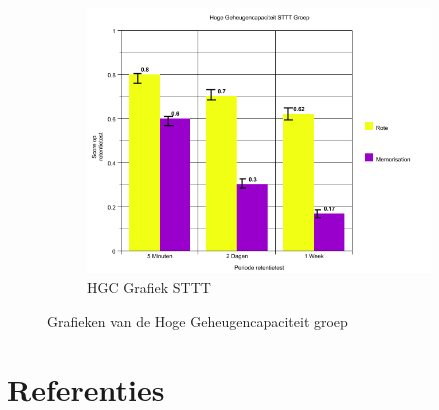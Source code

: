 \documentclass[12pt,a4paper]{article}
\begin{document}
\begin{figure}[h]
\begin{subfigure}{0.6\textwidth}
				\includegraphics[width=\linewidth]{grafiek5}
				\caption{HGC Grafiek STTT}
			\end{subfigure}
			\caption{Grafieken van de Hoge Geheugencapaciteit groep}
		\end{figure}
    \newpage
    \section{Referenties}
    
	\printbibliography
    
\end{document}
